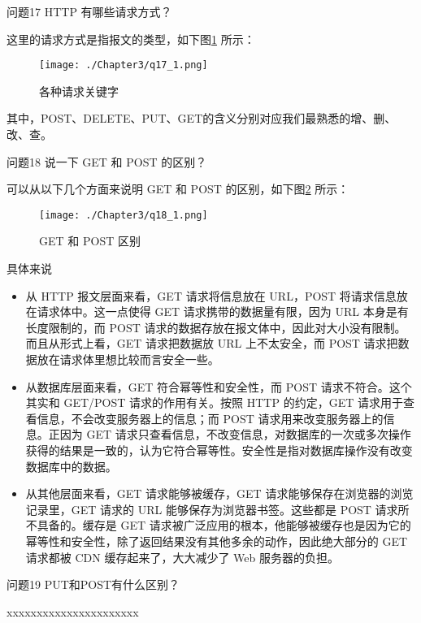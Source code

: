 \documentclass[cn,11pt,color=blue,lang=cn]{elegantbook}
\begin{document}
\begin{custom}{问题17}
HTTP 有哪些请求方式？
\end{custom}
\begin{solution}
这里的请求方式是指报文的类型，如下图\ref{fig17_1} 所示：
\begin{figure}[!h]
\centering
\texttt{[image: ./Chapter3/q17\_1.png]}
\caption{各种请求关键字}
\label{fig17_1}
\end{figure}
其中，POST、DELETE、PUT、GET的含义分别对应我们最熟悉的增、删、改、查。
\end{solution}
\newpage
\begin{custom}{问题18}
说⼀下 GET 和 POST 的区别？
\end{custom}
\begin{solution}
可以从以下几个方面来说明 GET 和 POST 的区别，如下图\ref{fig18_1} 所示：
\begin{figure}[htbp]
\centering
\texttt{[image: ./Chapter3/q18\_1.png]}
\caption{GET 和 POST 区别}
\label{fig18_1}
\end{figure}
具体来说
\begin{itemize}
	\item 从 HTTP 报文层面来看，GET 请求将信息放在 URL，POST 将请求信息放在请求体中。这一点使得 GET 请求携带的数据量有限，因为 URL 本身是有长度限制的，而 POST 请求的数据存放在报文体中，因此对大小没有限制。而且从形式上看，GET 请求把数据放 URL 上不太安全，而 POST 请求把数据放在请求体里想比较而言安全一些。
	\item 从数据库层面来看，GET 符合幂等性和安全性，而 POST 请求不符合。这个其实和 GET/POST 请求的作用有关。按照 HTTP 的约定，GET 请求用于查看信息，不会改变服务器上的信息；而 POST 请求用来改变服务器上的信息。正因为 GET 请求只查看信息，不改变信息，对数据库的一次或多次操作获得的结果是一致的，认为它符合幂等性。安全性是指对数据库操作没有改变数据库中的数据。
	\item 从其他层面来看，GET 请求能够被缓存，GET 请求能够保存在浏览器的浏览记录里，GET 请求的 URL 能够保存为浏览器书签。这些都是 POST 请求所不具备的。缓存是 GET 请求被广泛应用的根本，他能够被缓存也是因为它的幂等性和安全性，除了返回结果没有其他多余的动作，因此绝大部分的 GET 请求都被 CDN 缓存起来了，大大减少了 Web 服务器的负担。
\end{itemize}

\end{solution}

\begin{custom}{问题19}
PUT和POST有什么区别？
\end{custom}
\begin{solution}
xxxxxxxxxxxxxxxxxxxxxx
\end{solution}
\end{document}
